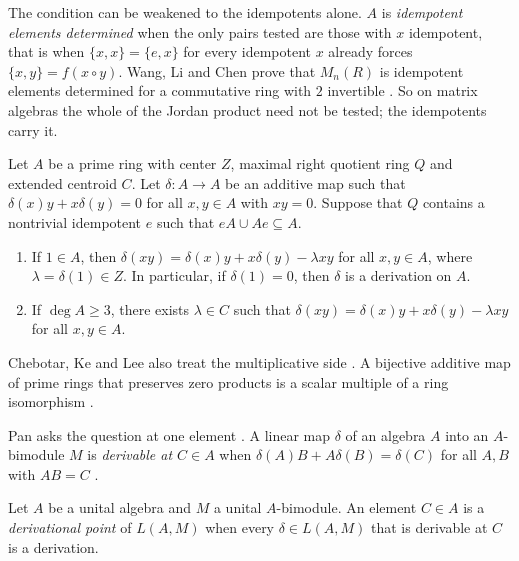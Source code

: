 The condition can be weakened to the idempotents alone. $A$ is
\emph{idempotent elements determined} \cite[Definition~1.2,
p.~2890]{WangLiChen2011Idempotent} when the only pairs tested are those with
$x$ idempotent, that is when $\{x,x\}=\{e,x\}$ for every idempotent $x$
already forces $\{x,y\}=f(x\circ y)$. Wang, Li and Chen prove that $M_{n}(R)$
is idempotent elements determined for a commutative ring with $2$ invertible
\cite[Theorem~2.4]{WangLiChen2011Idempotent}. So on matrix algebras the whole
of the Jordan product need not be tested; the idempotents carry it.

\begin{theorem}\label{thm:local:cklzero}
Let $A$ be a prime ring with center $Z$, maximal right quotient ring $Q$
and extended centroid $C$. Let $\delta\colon A\to A$ be an additive map such
that $\delta(x)y+x\delta(y)=0$ for all $x,y\in A$ with $xy=0$. Suppose that
$Q$ contains a nontrivial idempotent $e$ such that $eA\cup Ae\subseteq A$.
\begin{enumerate}
\item If $1\in A$, then $\delta(xy)=\delta(x)y+x\delta(y)-\lambda xy$ for
all $x,y\in A$, where $\lambda=\delta(1)\in Z$. In particular, if
$\delta(1)=0$, then $\delta$ is a derivation on $A$.
\item If $\deg A\geq 3$, there exists $\lambda\in C$ such that
$\delta(xy)=\delta(x)y+x\delta(y)-\lambda xy$ for all $x,y\in A$.
\end{enumerate}
\end{theorem}

Chebotar, Ke and Lee also treat the multiplicative side
\cite[p.~217]{ChebotarKeLee2004}. A bijective
additive map of prime rings that preserves zero products is a scalar
multiple of a ring isomorphism
\cite[Theorem~1, pp.~217--218]{ChebotarKeLee2004}.

Pan asks the question at one element
\cite[p.~4251]{Pan2012Derivable}. A linear map $\delta$ of an algebra
$A$ into an $A$-bimodule $M$ is \emph{derivable at $C\in A$} when
$\delta(A)B+A\delta(B)=\delta(C)$ for all $A,B$ with $AB=C$
\cite[p.~4251]{Pan2012Derivable}.

\begin{definition}\label{def:local:derivpoint}
Let $A$ be a unital algebra and $M$ a unital $A$-bimodule. An element $C\in
A$ is a \emph{derivational point} of $L(A,M)$ when every $\delta\in L(A,M)$
that is derivable at $C$ is a derivation.
\end{definition}

